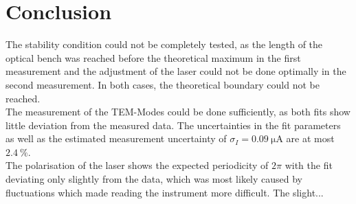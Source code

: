 \section{Conclusion}
The stability condition could not be completely tested, as the length of the optical
bench was reached before the theoretical maximum in the first measurement and the
adjustment of the laser could not be done optimally in the second measurement. In both
cases, the theoretical boundary could not be reached.
\\
The measurement of the TEM-Modes could be done sufficiently, as both fits show little
deviation from the measured data. The uncertainties in the fit parameters as well as
the estimated measurement uncertainty of $\sigma_{I} = \SI{0.09}{\micro\ampere}$ are at most
$\SI{2.4}{\percent}$.
\\
The polarisation of the laser shows the expected periodicity of $2\pi$ with the fit
deviating only slightly from the data, which was most likely caused by fluctuations
which made reading the instrument more difficult. The slight...
